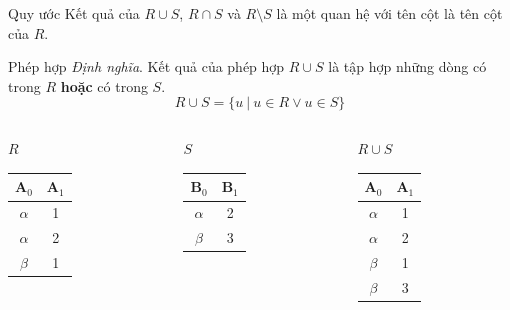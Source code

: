 \documentclass[11pt]{beamer}
\begin{document}
  \begin{frame}{Quy ước}
    Kết quả của $R \cup S$, $R \cap S$ và $R \setminus S$ là một quan hệ với tên cột là tên cột của $R$.
  \end{frame}
  \begin{frame}{Phép hợp}
    \textit{Định nghĩa}. Kết quả của phép hợp $R \cup S$ là tập hợp những dòng có trong $R$ \textbf{hoặc} có trong $S$.
    $$R \cup S = \{u\ |\ u \in R \vee u \in S\}$$
  \end{frame}
  \begin{frame}
    \begin{columns}[T]
      \begin{column}{0.3\textwidth}
        \centering $R$
        \medskip \\
        \begin{tabular}{|c|c|}
          \hline
          $\textbf{A}_0$ & $\textbf{A}_1$ \\[0.5ex] \hline\hline
          $\alpha$ & 1 \\ \hline
          $\alpha$ & 2 \\ \hline
          $\beta$ & 1 \\ \hline
        \end{tabular}
      \end{column}
      \begin{column}{0.3\textwidth}
        \centering $S$
        \medskip \\
        \begin{tabular}{|c|c|}
          \hline
          $\textbf{B}_0$ & $\textbf{B}_1$ \\[0.5ex] \hline\hline
          $\alpha$ & 2 \\ \hline
          $\beta$ & 3 \\ \hline
        \end{tabular}
      \end{column}
      \begin{column}{0.3\textwidth}
        \centering $R \cup S$
        \medskip \\
        \begin{tabular}{|c|c|}
          \hline
          $\textbf{A}_0$ & $\textbf{A}_1$ \\[0.5ex] \hline\hline
          $\alpha$ & 1 \\ \hline
          $\alpha$ & 2 \\ \hline
          $\beta$ & 1 \\ \hline
          $\beta$ & 3 \\ \hline
        \end{tabular}
      \end{column}
    \end{columns}
  \end{frame}
\end{document}
